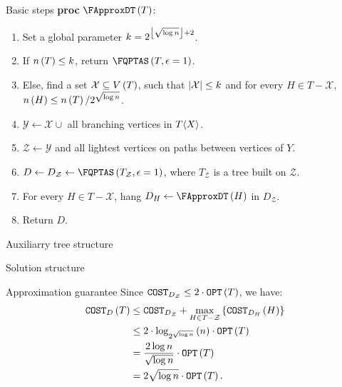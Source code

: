 \begin{frame}{Basic steps}{}
\textbf{proc} $\FApproxDT\br{T}$:
\begin{enumerate}
    \item Set a global parameter $k=2^{\left\lfloor \sqrt{\log n} \right\rfloor+2}$.
    \pause
    \item If $n\left( T \right)\leq k$, return $\FQPTAS\br{ T , \epsilon = 1}$.
    \pause
    \item Else, find a set $\mathcal{X}\subseteq V\left(  T  \right)$, such that $\left| \mathcal{X} \right|\leq k$ and for every $H\in T - \mathcal{X}$, $n\left( H \right)\leq n\left(  T  \right)/2^{\sqrt{\log n}}$.
    \pause
    \item $\mathcal{Y}\gets \mathcal{X} \cup $ all branching vertices in $ T \langle X \rangle$.
    \item $\mathcal{Z}\gets \mathcal{Y}$ and all lightest vertices on paths between vertices of $Y$.
    \item $D\gets D_\mathcal{Z}\gets \FQPTAS\br{T_{\mathcal{Z}}, \epsilon = 1}$, where $ T _{\mathcal{Z}}$ is a tree built on $\mathcal{Z}$.
    \pause
    \item For every $H\in T - \mathcal{X}$, hang $D_H\gets\FApproxDT\br{H}$ in $D_{\mathcal{Z}}$.
    \item Return $D$.
\end{enumerate}
\end{frame}
\begin{frame}{Auxiliarry tree structure}
    
\end{frame}
\begin{frame}{Solution structure}
    
\end{frame}
\begin{frame}{Approximation guarantee}
Since $\texttt{COST}_{D_\mathcal{Z}}\leq 2\cdot \texttt{OPT}\left( T \right)$, we have:
\begin{align*}
    \texttt{COST}_D\left( T \right) &\leq \texttt{COST}_{D_\mathcal{Z}} + \max_{H\in T-\mathcal{Z}}\left\{ \texttt{COST}_{D_H}\left( H \right) \right\}
    \\&\leq 
    2\cdot \log_{2^{\sqrt{\log n}}}\left( n \right)\cdot \texttt{OPT}\left( T \right) 
    \\&=
     \frac{2\log n}{\sqrt{\log n}}\cdot \texttt{OPT}\left( T \right) 
     \\&=
      2\sqrt{\log n}\cdot \texttt{OPT}\left( T \right).
\end{align*}
\end{frame}

